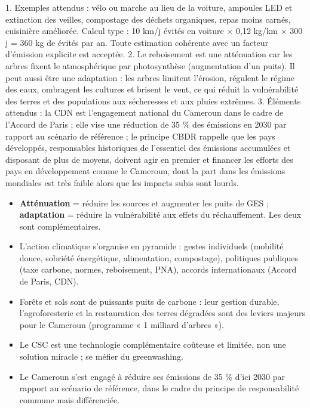 \documentclass[11pt]{article}
\begin{document}
\begin{corrige}
1. Exemples attendus : vélo ou marche au lieu de la voiture, ampoules LED et extinction des veilles, compostage des déchets organiques, repas moins carnés, cuisinière améliorée. Calcul type : 10 km/j évités en voiture $\times$ 0,12 kg/km $\times$ 300 j = 360 kg de  évités par an. Toute estimation cohérente avec un facteur d'émission explicite est acceptée.
2. Le reboisement est une atténuation car les arbres fixent le  atmosphérique par photosynthèse (augmentation d'un puits). Il peut aussi être une adaptation : les arbres limitent l'érosion, régulent le régime des eaux, ombragent les cultures et brisent le vent, ce qui réduit la vulnérabilité des terres et des populations aux sécheresses et aux pluies extrêmes.
3. Éléments attendus : la CDN est l'engagement national du Cameroun dans le cadre de l'Accord de Paris ; elle vise une réduction de 35 \% des émissions en 2030 par rapport au scénario de référence ; le principe CBDR rappelle que les pays développés, responsables historiques de l'essentiel des émissions accumulées et disposant de plus de moyens, doivent agir en premier et financer les efforts des pays en développement comme le Cameroun, dont la part dans les émissions mondiales est très faible alors que les impacts subis sont lourds.
\end{corrige}

\begin{aretenir}
\begin{itemize}
\item \textbf{Atténuation} = réduire les sources et augmenter les puits de GES ; \textbf{adaptation} = réduire la vulnérabilité aux effets du réchauffement. Les deux sont complémentaires.
\item L'action climatique s'organise en pyramide : gestes individuels (mobilité douce, sobriété énergétique, alimentation, compostage), politiques publiques (taxe carbone, normes, reboisement, PNA), accords internationaux (Accord de Paris, CDN).
\item Forêts et sols sont de puissants puits de carbone : leur gestion durable, l'agroforesterie et la restauration des terres dégradées sont des leviers majeurs pour le Cameroun (programme « 1 milliard d'arbres »).
\item Le CSC est une technologie complémentaire coûteuse et limitée, non une solution miracle ; se méfier du greenwashing.
\item Le Cameroun s'est engagé à réduire ses émissions de 35 \% d'ici 2030 par rapport au scénario de référence, dans le cadre du principe de responsabilité commune mais différenciée.
\end{itemize}
\end{aretenir}
\end{document}
